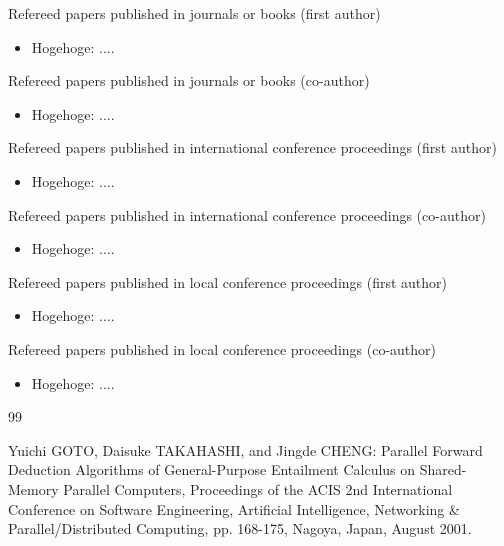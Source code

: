 \documentclass[12pt,epsf,dvipdfmx]{report}
\begin{document}
\begin{list}%
 {} %
 {} %
 \item Refereed papers published in journals or books (first author)
       \begin{itemize}
	\item Hogehoge: ....
       \end{itemize}
 \item Refereed papers published in journals or books (co-author)
       \begin{itemize}
	\item Hogehoge: ....
       \end{itemize}
 \item Refereed papers published in international conference proceedings (first author)       \begin{itemize}
	\item Hogehoge: ....
       \end{itemize}

 \item Refereed papers published in international conference proceedings (co-author)
       \begin{itemize}
	\item Hogehoge: ....
       \end{itemize}
 \item Refereed papers published in local conference proceedings (first author)
       \begin{itemize}
	\item Hogehoge: ....
       \end{itemize}
 \item Refereed papers published in local conference proceedings (co-author)
       \begin{itemize}
	\item Hogehoge: ....
       \end{itemize}
\end{list}



%
%

\begin{thebibliography}{99}
\label{sannkoubunnkenn_chapter}

Yuichi GOTO, Daisuke TAKAHASHI, and Jingde CHENG: Parallel Forward
        Deduction Algorithms of General-Purpose Entailment Calculus on
        Shared-Memory Parallel Computers, Proceedings of the ACIS 2nd
        International Conference on Software Engineering, Artificial
        Intelligence, Networking \& Parallel/Distributed Computing,
        pp. 168-175, Nagoya, Japan, August 2001.

\end{thebibliography}
\end{document}
